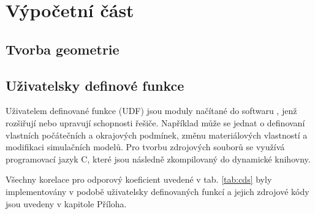 \chapter{Výpočetní část}

\section{Tvorba geometrie}

\section{Uživatelsky definové funkce}
Uživatelem definované funkce (UDF) jsou moduly načítané do softwaru \flu, jenž rozšiřují nebo upravují schopnosti řešiče. Například může se jednat o definovaní vlastních počátečních a okrajových podmínek, změnu materiálových vlastností a modifikaci simulačních modelů. Pro tvorbu zdrojových souborů se využívá programovací jazyk C, které jsou následně zkompilovaný do dynamické knihovny.

Všechny korelace pro odporový koeficient uvedené v tab. \ref{tab:cds} byly implementovány v podobě uživatelsky definovaných funkcí a jejich zdrojové kódy jsou uvedeny v kapitole Příloha.


